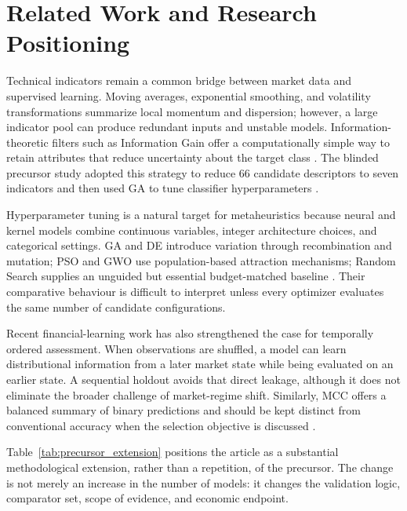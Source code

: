 \section{Related Work and Research Positioning}\label{sec:related_work}

Technical indicators remain a common bridge between market data and supervised learning. Moving averages, exponential smoothing, and volatility transformations summarize local momentum and dispersion; however, a large indicator pool can produce redundant inputs and unstable models. Information-theoretic filters such as Information Gain offer a computationally simple way to retain attributes that reduce uncertainty about the target class \cite{lei2012feature,kumar2014feature}. The blinded precursor study adopted this strategy to reduce 66 candidate descriptors to seven indicators and then used GA to tune classifier hyperparameters \cite{anonymous2026precursor}.

Hyperparameter tuning is a natural target for metaheuristics because neural and kernel models combine continuous variables, integer architecture choices, and categorical settings. GA and DE introduce variation through recombination and mutation; PSO and GWO use population-based attraction mechanisms; Random Search supplies an unguided but essential budget-matched baseline \cite{goldberg1989ga,kennedy1995pso,storn1997de,faris2018gwo_review,bergstra2012random_search}. Their comparative behaviour is difficult to interpret unless every optimizer evaluates the same number of candidate configurations.

Recent financial-learning work has also strengthened the case for temporally ordered assessment. When observations are shuffled, a model can learn distributional information from a later market state while being evaluated on an earlier state. A sequential holdout avoids that direct leakage, although it does not eliminate the broader challenge of market-regime shift. Similarly, MCC offers a balanced summary of binary predictions and should be kept distinct from conventional accuracy when the selection objective is discussed \cite{chicco2020mcc}.

Table~\ref{tab:precursor_extension} positions the article as a substantial methodological extension, rather than a repetition, of the precursor. The change is not merely an increase in the number of models: it changes the validation logic, comparator set, scope of evidence, and economic endpoint.

